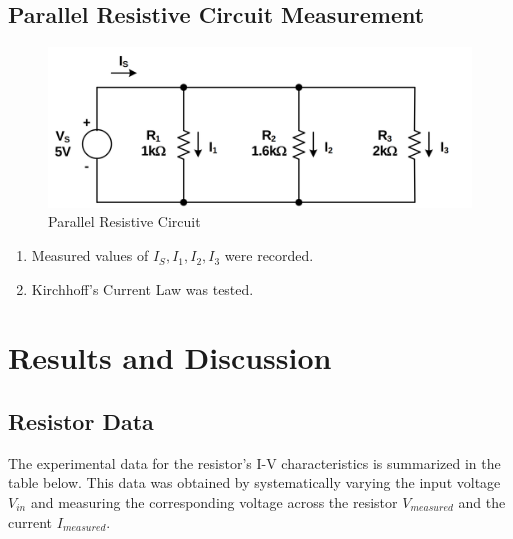 \documentclass[12pt]{article}
\begin{document}
\subsection{Parallel Resistive Circuit Measurement}

\begin{figure}[H]
	\center
	\includegraphics[scale=.2]{exp4}
	\caption{Parallel Resistive Circuit}
	\label{fig:exp4}
\end{figure}

\begin{enumerate}
	\item Measured values of \( I_S, I_1, I_2, I_3 \) were recorded.
	\item Kirchhoff’s Current Law was tested.
\end{enumerate}

\section{Results and Discussion}

\subsection{Resistor Data}
The experimental data for the resistor's I-V characteristics is summarized in the table below. This data was obtained by systematically varying the input voltage \( V_{in} \) and measuring the corresponding voltage across the resistor \( V_{measured} \) and the current \( I_{measured} \).
\end{document}
